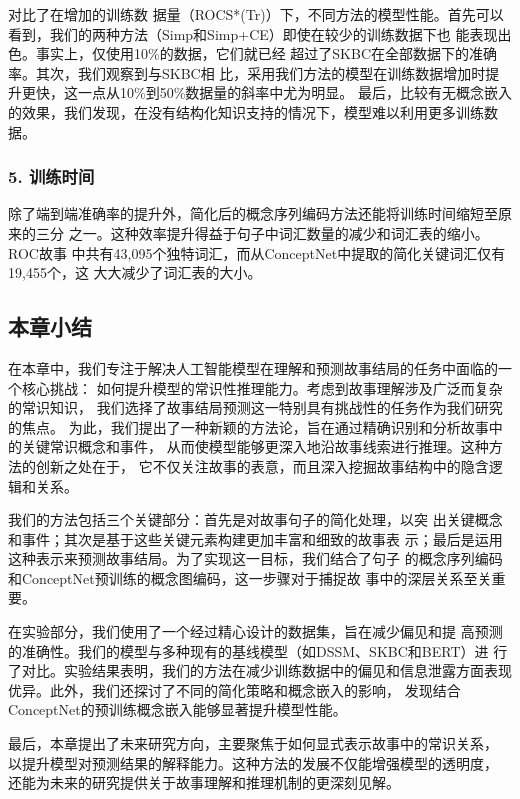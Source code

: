  对比了在增加的训练数
据量（ROCS*(Tr)）下，不同方法的模型性能。首先可以
看到，我们的两种方法（Simp和Simp+CE）即使在较少的训练数据下也
能表现出色。事实上，仅使用10\%的数据，它们就已经
超过了SKBC在全部数据下的准确率。其次，我们观察到与SKBC相
比，采用我们方法的模型在训练数据增加时提升更快，这一点从10\%到50\%数据量的斜率中尤为明显。
最后，比较有无概念嵌入的效果，我们发现，在没有结构化知识支持的情况下，模型难以利用更多训练数据。

\subsubsection*{5. 训练时间}
\label{sec2:time}
除了端到端准确率的提升外，简化后的概念序列编码方法还能将训练时间缩短至原来的三分
之一。这种效率提升得益于句子中词汇数量的减少和词汇表的缩小。ROC故事
中共有43,095个独特词汇，而从ConceptNet中提取的简化关键词汇仅有19,455个，这
大大减少了词汇表的大小。



\subsection{本章小结}

在本章中，我们专注于解决人工智能模型在理解和预测故事结局的任务中面临的一个核心挑战：
如何提升模型的常识性推理能力。考虑到故事理解涉及广泛而复杂的常识知识，
我们选择了故事结局预测这一特别具有挑战性的任务作为我们研究的焦点。
为此，我们提出了一种新颖的方法论，旨在通过精确识别和分析故事中的关键常识概念和事件，
从而使模型能够更深入地沿故事线索进行推理。这种方法的创新之处在于，
它不仅关注故事的表意，而且深入挖掘故事结构中的隐含逻辑和关系。

我们的方法包括三个关键部分：首先是对故事句子的简化处理，以突
出关键概念和事件；其次是基于这些关键元素构建更加丰富和细致的故事表
示；最后是运用这种表示来预测故事结局。为了实现这一目标，我们结合了句子
的概念序列编码和ConceptNet预训练的概念图编码，这一步骤对于捕捉故
事中的深层关系至关重要。

在实验部分，我们使用了一个经过精心设计的数据集，旨在减少偏见和提
高预测的准确性。我们的模型与多种现有的基线模型（如DSSM、SKBC和BERT）进
行了对比。实验结果表明，我们的方法在减少训练数据中的偏见和信息泄露方面表现
优异。此外，我们还探讨了不同的简化策略和概念嵌入的影响，
发现结合ConceptNet的预训练概念嵌入能够显著提升模型性能。

最后，本章提出了未来研究方向，主要聚焦于如何显式表示故事中的常识关系，
以提升模型对预测结果的解释能力。这种方法的发展不仅能增强模型的透明度，
还能为未来的研究提供关于故事理解和推理机制的更深刻见解。






